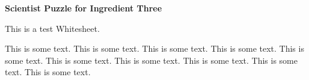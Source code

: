 \documentclass[white]{guildcamp3}
\begin{document}
\name{\wSciPuzzleThree{}} %

\large\textbf{Scientist Puzzle for Ingredient Three}  

This is a test Whitesheet.



This is some text.  This is some text.  This is some text.  This is
some text.  This is some text.  This is some text.  This is some text.
This is some text.  This is some text.  This is some text.
\end{document}
